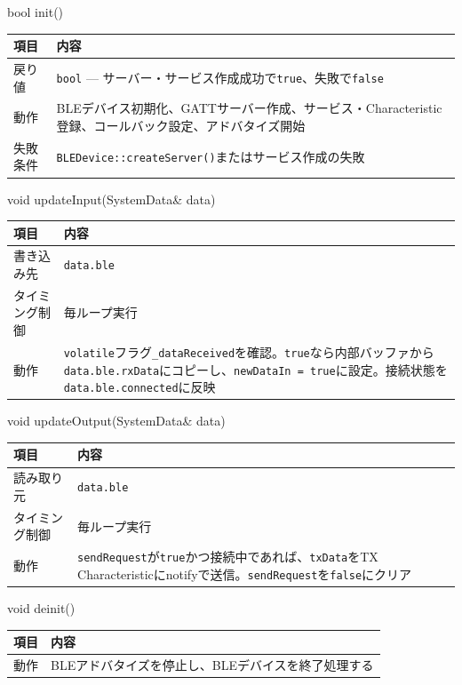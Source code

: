 \begin{funcblock}{bool init()}
\begin{tabularx}{\textwidth}{l X}
\toprule
\textbf{項目} & \textbf{内容} \\
\midrule
戻り値     & \texttt{bool} --- サーバー・サービス作成成功で\texttt{true}、失敗で\texttt{false} \\
動作       & BLEデバイス初期化、GATTサーバー作成、サービス・Characteristic登録、コールバック設定、アドバタイズ開始 \\
失敗条件   & \texttt{BLEDevice::createServer()}またはサービス作成の失敗 \\
\bottomrule
\end{tabularx}
\end{funcblock}

\begin{funcblock}{void updateInput(SystemData\& data)}
\begin{tabularx}{\textwidth}{l X}
\toprule
\textbf{項目} & \textbf{内容} \\
\midrule
書き込み先     & \texttt{data.ble} \\
タイミング制御 & 毎ループ実行 \\
動作           & \texttt{volatile}フラグ\texttt{\_dataReceived}を確認。\texttt{true}なら内部バッファから\texttt{data.ble.rxData}にコピーし、\texttt{newDataIn = true}に設定。接続状態を\texttt{data.ble.connected}に反映 \\
\bottomrule
\end{tabularx}
\end{funcblock}

\begin{funcblock}{void updateOutput(SystemData\& data)}
\begin{tabularx}{\textwidth}{l X}
\toprule
\textbf{項目} & \textbf{内容} \\
\midrule
読み取り元     & \texttt{data.ble} \\
タイミング制御 & 毎ループ実行 \\
動作           & \texttt{sendRequest}が\texttt{true}かつ接続中であれば、\texttt{txData}をTX Characteristicにnotifyで送信。\texttt{sendRequest}を\texttt{false}にクリア \\
\bottomrule
\end{tabularx}
\end{funcblock}

\begin{funcblock}{void deinit()}
\begin{tabularx}{\textwidth}{l X}
\toprule
\textbf{項目} & \textbf{内容} \\
\midrule
動作   & BLEアドバタイズを停止し、BLEデバイスを終了処理する \\
\bottomrule
\end{tabularx}
\end{funcblock}

